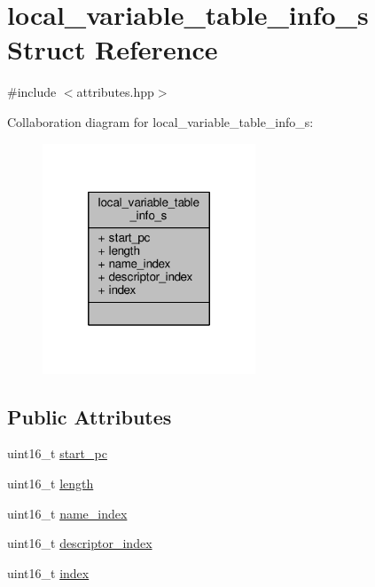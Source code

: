 \hypertarget{structlocal__variable__table__info__s}{\section{local\+\_\+variable\+\_\+table\+\_\+info\+\_\+s Struct Reference}
\label{structlocal__variable__table__info__s}
}


{\ttfamily \#include $<$attributes.\+hpp$>$}



Collaboration diagram for local\+\_\+variable\+\_\+table\+\_\+info\+\_\+s\+:\nopagebreak
\begin{figure}[H]
\begin{center}
\leavevmode
\includegraphics[width=180pt]{structlocal__variable__table__info__s__coll__graph}
\end{center}
\end{figure}
\subsection*{Public Attributes}
\begin{DoxyCompactItemize}
\item 
uint16\+\_\+t \hyperlink{structlocal__variable__table__info__s_a1acd5397525801c3fd91411f647e899c}{start\+\_\+pc}
\item 
uint16\+\_\+t \hyperlink{structlocal__variable__table__info__s_a538a35225c4c1c2c3a32df0f980ef33a}{length}
\item 
uint16\+\_\+t \hyperlink{structlocal__variable__table__info__s_a353fe8c7dceb360da703a4079712692e}{name\+\_\+index}
\item 
uint16\+\_\+t \hyperlink{structlocal__variable__table__info__s_a93d5eda8b9de1714e238dd69cd0db2d5}{descriptor\+\_\+index}
\item 
uint16\+\_\+t \hyperlink{structlocal__variable__table__info__s_a53c64633d6eb65d829cf83b1e344e2b7}{index}
\end{DoxyCompactItemize}


